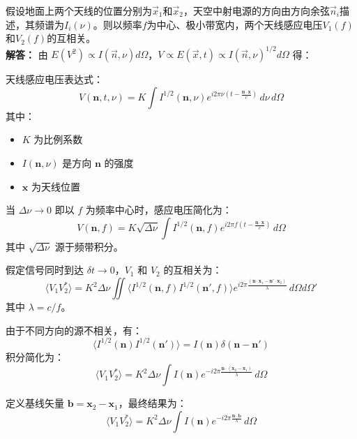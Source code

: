 \documentclass{article}
\begin{document}
假设地面上两个天线的位置分别为$\vec{x}_1$和$\vec{x}_2$，天空中射电源的方向由方向余弦$\vec{n}_i$描述，其频谱为$I_i(\nu)$。则以频率$f$为中心、极小带宽内，两个天线感应电压$V_1(f)$和$V_2(f)$的互相关。
\\

\textbf{解答：}
由 $E(V^2) \propto I(\vec{n},\nu)d\Omega$，$V \propto E(\vec{x},t) \propto  I(\vec{n},\nu)^{1/2} d\Omega $ 得：

天线感应电压表达式：
\begin{equation}
    V(\mathbf{n}, t,\nu) = K \int I^{1/2}(\mathbf{n}, \nu) e^{i2\pi \nu(t- \frac{\mathbf{n} \cdot \mathbf{x}}{c})} \, d\nu \, d\Omega
\end{equation}
其中：
\begin{itemize}
    \item $K$ 为比例系数
    \item $I(\mathbf{n}, \nu)$ 是方向 $\mathbf{n}$ 的强度
    \item $\mathbf{x}$ 为天线位置
\end{itemize}

当 $\Delta \nu \to 0$ 即以 $f$ 为频率中心时，感应电压简化为：
\begin{equation}
    V(\mathbf{n}, f) = K \sqrt{\Delta \nu} \int I^{1/2}(\mathbf{n}, f) e^{i2\pi f(t- \frac{\mathbf{n} \cdot \mathbf{x}}{c})}\, d\Omega
\end{equation}
其中 $\sqrt{\Delta \nu}$ 源于频带积分。

假定信号同时到达 $\delta t \to 0$，$V_1$ 和 $V_2$ 的互相关为：
\begin{equation}
    \langle V_1 V_2^* \rangle = K^2 \Delta \nu \iint \langle I^{1/2}(\mathbf{n},f)I^{1/2}(\mathbf{n}',f) \rangle e^{i2\pi \frac{(\mathbf{n} \cdot \mathbf{x}_1 - \mathbf{n}' \cdot \mathbf{x}_2)}{\lambda}} \, d\Omega d\Omega'
\end{equation}
其中 $\lambda = c/f$。

由于不同方向的源不相关，有：
\begin{equation}
    \langle I^{1/2}(\mathbf{n})I^{1/2}(\mathbf{n}') \rangle = I(\mathbf{n}) \delta(\mathbf{n}-\mathbf{n}')
\end{equation}
积分简化为：
\begin{equation}
    \langle V_1 V_2^* \rangle = K^2 \Delta \nu \int I(\mathbf{n}) e^{-i2\pi \frac{\mathbf{n} \cdot (\mathbf{x}_2 - \mathbf{x}_1)}{\lambda}} \, d\Omega
\end{equation}

定义基线矢量 $\mathbf{b} = \mathbf{x}_2 - \mathbf{x}_1$，最终结果为：
\begin{equation}
    \langle V_1 V_2^* \rangle = K^2 \Delta \nu \int I(\mathbf{n}) e^{-i2\pi \frac{\mathbf{n} \cdot \mathbf{b}}{\lambda}} \, d\Omega
\end{equation}
\end{document}

